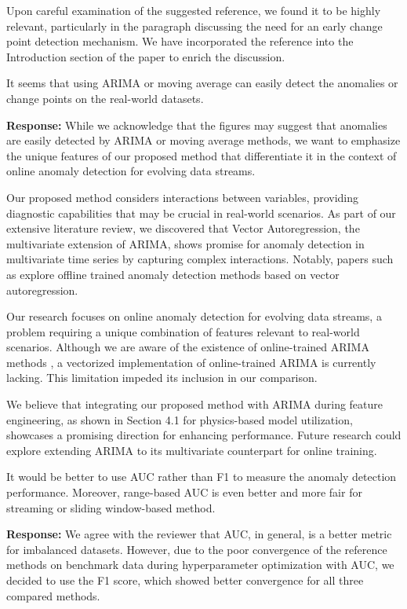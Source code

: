 \documentclass{article}
\makeatletter
\newenvironment{comment}{
\begin{sloppypar}\slshape
\vspace{5 mm}
\color{blue}
 \@beginparpenalty\@M
  \begin{list}{}{\setlength{\topsep}{0ex}%
  \setlength{\leftmargin}{\rightmargin}}\item[]
 \@beginparpenalty\@endparpenalty
}
{\end{list}
\end{sloppypar}
}
\makeatother
\begin{document}
\begin{enumerate}
        Upon careful examination of the suggested reference, we found it to be highly relevant, particularly in the paragraph discussing the need for an early change point detection mechanism. We have incorporated the reference into the Introduction section of the paper to enrich the discussion.

  \item
        \begin{comment}
        It seems that using ARIMA or moving average can easily detect the anomalies or change points on the real-world datasets.
        \end{comment}
        {\bf Response:}
        While we acknowledge that the figures may suggest that anomalies are easily detected by ARIMA or moving average methods, we want to emphasize the unique features of our proposed method that differentiate it in the context of online anomaly detection for evolving data streams.

        Our proposed method considers interactions between variables, providing diagnostic capabilities that may be crucial in real-world scenarios. As part of our extensive literature review, we discovered that Vector Autoregression, the multivariate extension of ARIMA, shows promise for anomaly detection in multivariate time series by capturing complex interactions. Notably, papers such as \cite{Melnyk2016, Zhang2023} explore offline trained anomaly detection methods based on vector autoregression.

        Our research focuses on online anomaly detection for evolving data streams, a problem requiring a unique combination of features relevant to real-world scenarios. Although we are aware of the existence of online-trained ARIMA methods \cite{Anava2013}, a vectorized implementation of online-trained ARIMA is currently lacking. This limitation impeded its inclusion in our comparison.

        We believe that integrating our proposed method with ARIMA during feature engineering, as shown in Section 4.1 for physics-based model utilization, showcases a promising direction for enhancing performance. Future research could explore extending ARIMA to its multivariate counterpart for online training.

  \item
        \begin{comment}
        It would be better to use AUC rather than F1 to measure the anomaly detection performance. Moreover, range-based AUC is even better and more fair for streaming or sliding window-based method.
        \end{comment}
        {\bf Response:}
        We agree with the reviewer that AUC, in general, is a better metric for imbalanced datasets. However, due to the poor convergence of the reference methods on benchmark data during hyperparameter optimization with AUC, we decided to use the F1 score, which showed better convergence for all three compared methods.


\end{enumerate}
\end{document}
